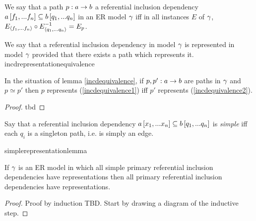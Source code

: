 \begin{definition}
We say that a path $p:a \rightarrow b$  a referential inclusion dependency
$a\left[f_1,...f_n\right]\subseteq b\left[q_1,...q_n\right]$  in an ER model $\gamma$ iff
  in all instances $E$ of $\gamma$, $E_{\langle f_1,...f_n\rangle} \circ E_{\langle q_1,...q_n\rangle}^{-1}=E_p$.
\end{definition}
We say that a referential inclusion dependency in model $\gamma$ is represented in model $\gamma$ provided that there exists a path which represents it. 
incdrepresentationequivalence
\begin{lemma}
\label{incdrepresentationequivalence}
In the situation of lemma \ref{incdequivalence}, if $p,p':a \rightarrow b$
are paths in $\gamma$ and $p \simeq p'$ then $p$ represents (\ref{incdequivalence1})
iff $p'$ represents (\ref{incdequivalence2}). 
\end{lemma}
\begin{proof}
tbd
\end{proof}
\iffalse
\begin{categoricalaside}
If an ER schema is represented as a category with finite products (\textit{a la} Johnstone \textit{et al}) then
a referential inclusion dependency is a diagram
\begin{center}
$
\begin{array}{cp{0.75cm}c}
   \Rnode{a}{a}     & & \Rnode{x}{x}  \\[1.2cm]     
	                  & & \Rnode{b}{b}  
\end{array}
$
\ncarr{a}{x} 
\alabel{f}[0.33]
\ncarr{b}{x}
\blabel{m}[0.3]
\idcomp
\end{center}
\noindent
in \cat{C} such that in all instance functors $F$, 
$F(f)$ factors through $F(m)$.

Such a referential inclusion dependency is explicitly represented iff
 $f$ factors through $m$ i.e. there is an $f_0: a \morph b$ in \cat{C} such that 
$f_0 \circ m =f$. Note that because $m$ is monic then such an $f_0$ is the unique such morphism and if in some instance $F$,
$e: F(a) \morph F(b)$ is a function such that $e \circ F(m) = F(f)$ then $F(f_0)=e$. 
\end{categoricalaside}
\fi


\begin{definition}
Say that a referential inclusion dependency $a\left[x_1,...x_n\right]\subseteq b\left[q_1,...q_n\right]$ is \textit{simple}
iff each $q_i$ is a singleton path, i.e. is simply an edge. 
\end{definition}

simplerepresentationlemma
\begin{lemma}
\label{simplerepresentationlemma}
If  $\gamma$ is an ER model in which all simple primary referential inclusion dependencies
have representations then all primary referential inclusion dependencies have representations. 
\end{lemma}
\begin{proof}
Proof by induction TBD. Start by drawing a diagram of the inductive step.
\end{proof}




